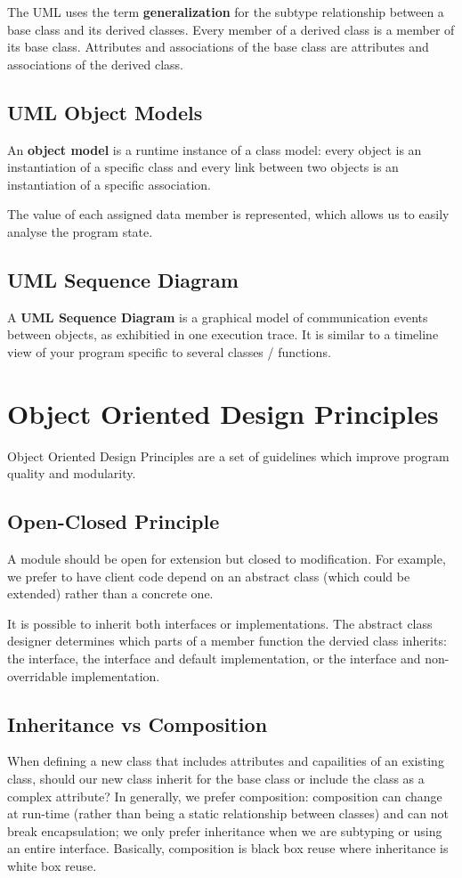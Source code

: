\documentclass[12pt]{article}
\begin{document}
The UML uses the term {\bf generalization} for the subtype relationship between a base class and its derived classes. Every member of a derived class is a member of its base class. Attributes and associations of the base class are attributes and associations of the derived class.

\subsection{UML Object Models}
An {\bf object model} is a runtime instance of a class model: every object is an instantiation of a specific class and every link between two objects is an instantiation of a specific association.

The value of each assigned data member is represented, which allows us to easily analyse the program state.

\subsection{UML Sequence Diagram}
A {\bf UML Sequence Diagram} is a graphical model of communication events between objects, as exhibitied in one execution trace. It is similar to a timeline view of your program specific to several classes / functions.

\section{Object Oriented Design Principles}
Object Oriented Design Principles are a set of guidelines which improve program quality and modularity.

\subsection{Open-Closed Principle}
A module should be open for extension but closed to modification. For example, we prefer to have client code depend on an abstract class (which could be extended) rather than a concrete one.

It is possible to inherit both interfaces or implementations. The abstract class designer determines which parts of a member function the dervied class inherits: the interface, the interface and default implementation, or the interface and non-overridable implementation.

\subsection{Inheritance vs Composition}
When defining a new class that includes attributes and capailities of an existing class, should our new class inherit for the base class or include the class as a complex attribute? In generally, we prefer composition: composition can change at run-time (rather than being a static relationship between classes) and can not break encapsulation; we only prefer inheritance when we are subtyping or using an entire interface. Basically, composition is black box reuse where inheritance is white box reuse.
\end{document}
